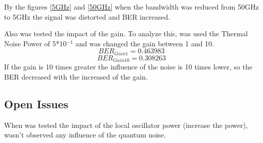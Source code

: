 By the figures \ref{5GHz} and \ref{50GHz} when the bandwidth was reduced from 50GHz to 5GHz the signal was distorted and BER increased.\par

Also was tested the impact of the gain. To analyze this, was used the Thermal Noise Power of 5*10$^{-1}$ and was changed the gain between 1 and 10.
\begin{equation*}
BER_{Gain1} = 0.463983
\end{equation*}
\begin{equation*}
BER_{Gain10} = 0.308263
\end{equation*}
If the gain is 10 times greater the influence of the noise is 10 times lower, so the BER decreased with the increased of the gain.

\subsection*{Open Issues}
When was tested the impact of the local oscillator power (increase the power), wasn't observed any influence of the quantum noise.
